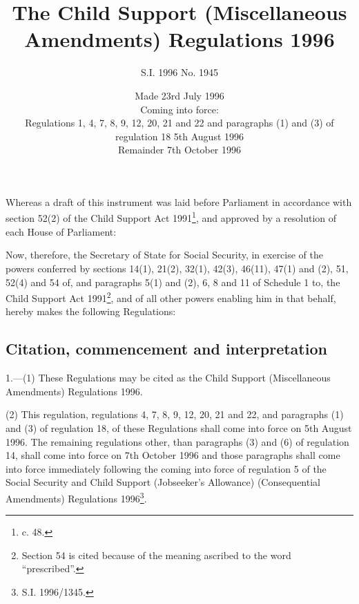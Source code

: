 \documentclass[a4paper]{article}
\title{The Child Support (Miscellaneous Amendments) Regulations 1996}
\author{S.I. 1996 No. 1945}
\date{Made 23rd July 1996\\Coming into force:\\
Regulations 1, 4, 7, 8, 9, 12, 20, 21 and 22 and paragraphs (1) and (3) of regulation 18 5th August 1996\\Remainder 7th October 1996}
\begin{document}
\maketitle

\noindent
Whereas a draft of this instrument was laid before Parliament in accordance with section 52(2) of the Child Support Act 1991\footnote{ c. 48.}, and approved by a resolution of each House of Parliament:

 Now, therefore, the Secretary of State for Social Security, in exercise of the powers conferred by sections 14(1), 21(2), 32(1), 42(3), 46(11), 47(1) and (2), 51, 52(4) and 54 of, and paragraphs 5(1) and (2), 6, 8 and 11 of Schedule 1 to, the Child Support Act 1991\footnote{\frenchspacing Section 54 is cited because of the meaning ascribed to the word “prescribed”.}, and of all other powers enabling him in that behalf, hereby makes the following Regulations:

{\sloppy

\tableofcontents

}

\setcounter{secnumdepth}{-2}

\subsection[1. Citation, commencement and interpretation]{Citation, commencement and interpretation}

1.—(1) These Regulations may be cited as the Child Support (Miscellaneous Amendments) Regulations 1996.

(2) This regulation, regulations 4, 7, 8, 9, 12, 20, 21 and 22, and paragraphs (1) and (3) of regulation 18, of these Regulations shall come into force on 5th August 1996. The remaining regulations other, than paragraphs (3) and (6) of regulation 14, shall come into force on 7th October 1996 and those paragraphs shall come into force immediately following the coming into force of regulation 5 of the Social Security and Child Support (Jobseeker’s Allowance) (Consequential Amendments) Regulations 1996\footnote{\frenchspacing S.I. 1996/1345.}.
\end{document}
